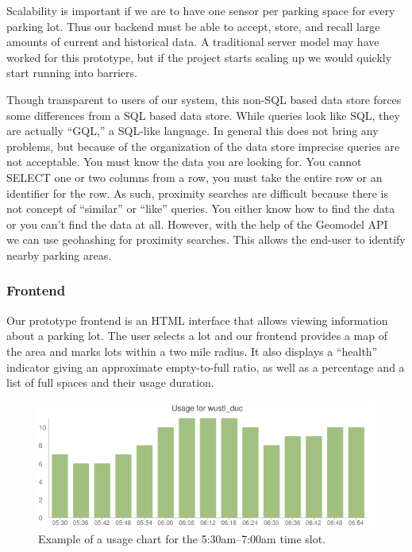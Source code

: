 \documentclass{acm_proc}
\begin{document}
Scalability is important if we are to have one sensor per parking space for
every parking lot.
Thus our backend must be able to accept, store, and recall large amounts of
current and historical data.
A traditional server model may have worked for this prototype, but if the
project starts scaling up we would quickly start running into barriers.

Though transparent to users of our system, this non-SQL based data store
forces some differences from a SQL based data store.
While queries look like SQL, they are actually ``GQL,'' a SQL-like
language.
In general this does not bring any problems, but because of the
organization of the data store imprecise queries are not acceptable.
You must know the data you are looking for.
You cannot SELECT one or two columns from a row, you
must take the entire row or an identifier for the row.
As such, proximity searches are difficult because there is not concept of
``similar'' or ``like'' queries.
You either know how to find the data or you can't find the data at all.
However, with the help of the Geomodel API~\cite{geomodel} we can
use geohashing for proximity searches.
This allows the end-user to identify nearby parking areas.

\subsubsection{Frontend}

Our prototype frontend is an HTML interface that allows viewing information
about a parking lot.
The user selects a lot and our frontend provides a map of the area and
marks lots within a two mile radius.
It also displays a ``health'' indicator giving an approximate empty-to-full
ratio, as well as a percentage and a list of full spaces and their usage
duration.

\begin{figure}
    \begin{center}
		\includegraphics[width=\columnwidth]{figures/fullness-chart}
	\end{center}
	\caption{Example of a usage chart for the 5:30am--7:00am time slot.}
	\label{fig:fullness-chart}
\end{figure}
\end{document}

